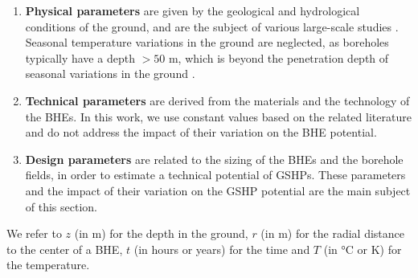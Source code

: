\begin{enumerate}
\item \textbf{Physical parameters} are given by the geological and hydrological conditions of the ground, and are the subject of various large-scale studies \cite{signorelli_regional_2004,majorowicz_estimation_2009,tian_improved_2020}. Seasonal temperature variations in the ground are neglected, as boreholes typically have a depth $> 50$ m, which is beyond the penetration depth of seasonal variations in the ground \cite{stauffer_thermal_2013}.

\item \textbf{Technical parameters} are derived from the materials and the technology of the BHEs. In this work, we use constant values based on the related literature and do not address the impact of their variation on the BHE potential.

\item \textbf{Design parameters} are related to the sizing of the BHEs and the borehole fields, in order to estimate a technical potential of GSHPs. These parameters and the impact of their variation on the GSHP potential are the main subject of this section. 
\end{enumerate}

We refer to $z$ (in m) for the depth in the ground, $r$ (in m) for the radial distance to the center of a BHE, $t$ (in hours or years) for the time and $T$ (in °C or K) for the temperature. 

